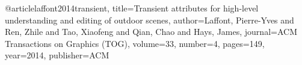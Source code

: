 @article{laffont2014transient,
  title={Transient attributes for high-level understanding and editing of outdoor scenes},
  author={Laffont, Pierre-Yves and Ren, Zhile and Tao, Xiaofeng and Qian, Chao and Hays, James},
  journal={ACM Transactions on Graphics (TOG)},
  volume={33},
  number={4},
  pages={149},
  year={2014},
  publisher={ACM}
}
